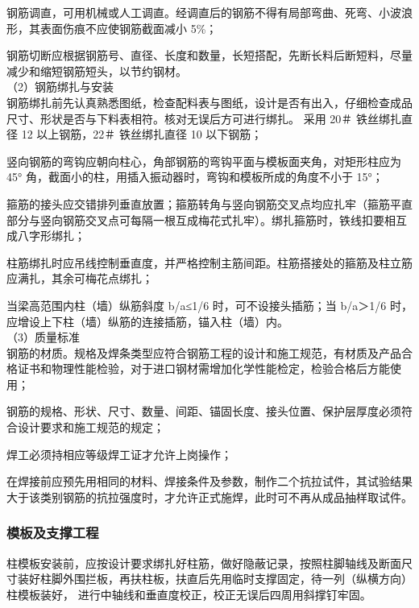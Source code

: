  钢筋调直，可用机械或人工调直。经调直后的钢筋不得有局部弯曲、死弯、小波浪形，其表面伤痕不应使钢筋截面减小 5\%；

 钢筋切断应根据钢筋号、直径、长度和数量，长短搭配，先断长料后断短料，尽量减少和缩短钢筋短头，以节约钢材。\\


（2）钢筋绑扎与安装\\

钢筋绑扎前先认真熟悉图纸，检查配料表与图纸，设计是否有出入，仔细检查成品尺寸、形状是否与下料表相符。核对无误后方可进行绑扎。
采用 20＃ 铁丝绑扎直径 12 以上钢筋，22＃ 铁丝绑扎直径 10 以下钢筋；

 竖向钢筋的弯钩应朝向柱心，角部钢筋的弯钩平面与模板面夹角，对矩形柱应为 45° 角，截面小的柱，用插入振动器时，弯钩和模板所成的角度不小于 15°；

 箍筋的接头应交错排列垂直放置；箍筋转角与竖向钢筋交叉点均应扎牢（箍筋平直部分与竖向钢筋交叉点可每隔一根互成梅花式扎牢）。绑扎箍筋时，铁线扣要相互成八字形绑扎；

 柱筋绑扎时应吊线控制垂直度，并严格控制主筋间距。柱筋搭接处的箍筋及柱立筋应满扎，其余可梅花点绑扎；

 当梁高范围内柱（墙）纵筋斜度 b/a≤1/6 时，可不设接头插筋；当 b/a＞1/6 时，应增设上下柱（墙）纵筋的连接插筋，锚入柱（墙）内。 \\

（3）质量标准\\

 钢筋的材质。规格及焊条类型应符合钢筋工程的设计和施工规范，有材质及产品合格证书和物理性能检验，对于进口钢材需增加化学性能检定，检验合格后方能使用；

 钢筋的规格、形状、尺寸、数量、间距、锚固长度、接头位置、保护层厚度必须符合设计要求和施工规范的规定；

 焊工必须持相应等级焊工证才允许上岗操作；

 在焊接前应预先用相同的材料、焊接条件及参数，制作二个抗拉试件，其试验结果大于该类别钢筋的抗拉强度时，才允许正式施焊，此时可不再从成品抽样取试件。


\subsubsection{模板及支撑工程}

柱模板安装前，应按设计要求绑扎好柱筋，做好隐蔽记录，按照柱脚轴线及断面尺寸装好柱脚外围拦板，再扶柱板，扶直后先用临时支撑固定，待一列（纵横方向）柱模板装好，
进行中轴线和垂直度校正，校正无误后四周用斜撑钉牢固。

